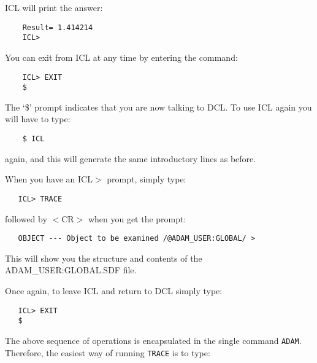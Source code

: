 ICL will print the answer:

\begin{small}
\begin{verbatim}
    Result= 1.414214
    ICL>
\end{verbatim}
\end{small}

You can exit from ICL at any time by entering the command:

\begin{small}
\begin{verbatim}
    ICL> EXIT
    $
\end{verbatim}
\end{small}

The `\$' prompt indicates that you are now talking to DCL.
To use ICL again you will have to type:

\begin{small}
\begin{verbatim}
    $ ICL
\end{verbatim}
\end{small}

again, and this will generate the same introductory lines as before.

When you have an ICL$>$ prompt, simply type:

\begin{small}
\begin{verbatim}
   ICL> TRACE
\end{verbatim}
\end{small}

followed by $<$CR$>$ when you get the prompt:

\begin{small}
\begin{verbatim}
   OBJECT --- Object to be examined /@ADAM_USER:GLOBAL/ >
\end{verbatim}
\end{small}

This will show you the structure and contents of the ADAM\_USER:GLOBAL.SDF
file.

Once again, to leave ICL and return to DCL simply type:

\begin{small}
\begin{verbatim}
   ICL> EXIT
   $
\end{verbatim}
\end{small}


The above sequence of operations is encapsulated in the single command
\verb+ADAM+.
Therefore, the easiest way of running \verb+TRACE+ is to type:


